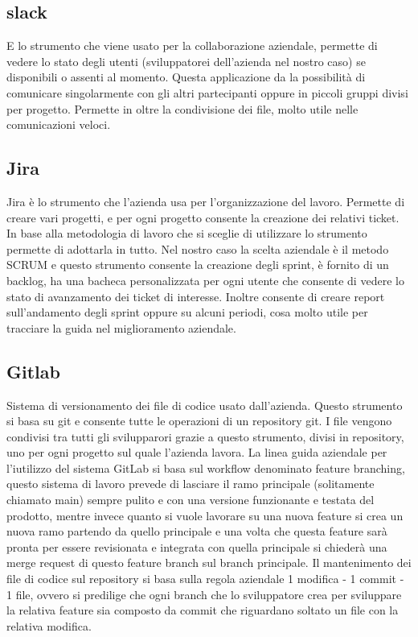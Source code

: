 \subsection*{slack}
E lo strumento che viene usato per la collaborazione aziendale, permette di vedere lo stato degli utenti (sviluppatorei dell'azienda
nel nostro caso) se disponibili o assenti al momento. Questa applicazione da la possibilità di comunicare singolarmente con gli altri
partecipanti oppure in piccoli gruppi divisi per progetto. Permette in oltre la condivisione dei file, molto utile nelle
comunicazioni veloci.

\subsection*{Jira}
Jira è lo strumento che l'azienda usa per l'organizzazione del lavoro. Permette di creare vari progetti, e per ogni progetto consente la
creazione dei relativi ticket. In base alla metodologia di lavoro che si sceglie di utilizzare lo strumento permette di adottarla in tutto.
Nel nostro caso la scelta aziendale è il metodo SCRUM e questo strumento consente la creazione degli sprint, è fornito di un backlog, ha
una bacheca personalizzata per ogni utente che consente di vedere lo stato di avanzamento dei ticket di interesse. Inoltre consente di creare
report sull'andamento degli sprint oppure su alcuni periodi, cosa molto utile per tracciare la guida nel miglioramento aziendale.

\subsection*{Gitlab}
Sistema di versionamento dei file di codice usato dall'azienda. Questo strumento si basa su git e consente tutte le operazioni di un repository git.
I file vengono condivisi tra tutti gli svilupparori grazie a questo strumento, divisi in repository, uno per ogni progetto sul quale l'azienda lavora.
La linea guida aziendale per l'iutilizzo del sistema GitLab si basa sul workflow denominato feature branching, questo sistema di lavoro
prevede di lasciare il ramo principale (solitamente chiamato main) sempre pulito e con una versione funzionante e testata del prodotto, mentre invece
quanto si vuole lavorare su una nuova feature si crea un nuova ramo partendo da quello principale e una volta che questa feature sarà pronta per essere
revisionata e integrata con quella principale si chiederà una merge request di questo feature branch sul branch principale.
Il mantenimento dei file di codice sul repository si basa sulla regola aziendale 1 modifica - 1 commit - 1 file, ovvero si predilige che ogni branch che lo sviluppatore crea per sviluppare la relativa feature
sia composto da commit che riguardano soltato un file con la relativa modifica.

